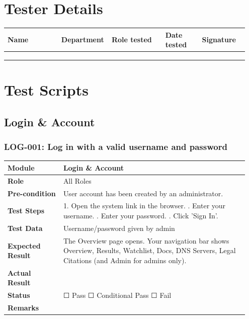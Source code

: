\documentclass[10pt]{article}
\begin{document}
\section{Tester Details}
\begin{longtable}{p{0.22\linewidth}p{0.17\linewidth}p{0.22\linewidth}p{0.15\linewidth}p{0.19\linewidth}}
\hline
\textbf{Name} & \textbf{Department} & \textbf{Role tested} & \textbf{Date tested} & \textbf{Signature} \\ \hline
\endhead
 & & & & \\[1cm] \hline
 & & & & \\[1cm] \hline
 & & & & \\[1cm] \hline
\end{longtable}

\clearpage
\section{Test Scripts}
\subsection{Login \& Account}
\subsubsection*{LOG-001: Log in with a valid username and password}
\begin{longtable}{p{0.22\linewidth}p{0.73\linewidth}}
\hline
\textbf{Module} & Login \& Account \\ \hline
\textbf{Role} & All Roles \\ \hline
\textbf{Pre-condition} & User account has been created by an administrator. \\ \hline
\textbf{Test Steps} & 1. Open the system link in the browser. \newline 2. Enter your username. \newline 3. Enter your password. \newline 4. Click 'Sign In'. \\ \hline
\textbf{Test Data} & Username/password given by admin \\ \hline
\textbf{Expected Result} & The Overview page opens. Your navigation bar shows Overview, Results, Watchlist, Docs, DNS Servers, Legal Citations (and Admin for admins only). \\ \hline
\textbf{Actual Result} & \newline \newline \\ \hline
\textbf{Status} & ☐ Pass \quad ☐ Conditional Pass \quad ☐ Fail \\ \hline
\textbf{Remarks} & \newline \\ \hline
\end{longtable}
\end{document}
